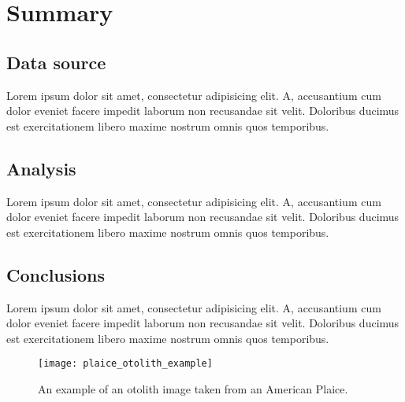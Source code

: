 \section{Summary}

\subsection{Data source}

Lorem ipsum dolor sit amet, consectetur adipisicing elit. A, accusantium cum dolor eveniet facere impedit laborum non recusandae sit velit.
Doloribus ducimus est exercitationem libero maxime nostrum omnis quos temporibus.

\subsection{Analysis}

Lorem ipsum dolor sit amet, consectetur adipisicing elit. A, accusantium cum dolor eveniet facere impedit laborum non recusandae sit velit. Doloribus ducimus est exercitationem libero maxime nostrum omnis quos temporibus.

\subsection{Conclusions}

Lorem ipsum dolor sit amet, consectetur adipisicing elit. A, accusantium cum dolor eveniet facere impedit laborum non recusandae sit velit. Doloribus ducimus est exercitationem libero maxime nostrum omnis quos temporibus.


\begin{figure}
    \texttt{[image: plaice\_otolith\_example]}
    \caption{An example of an otolith image taken from an American Plaice.}
    \label{fig:plaice_oto_example}
\end{figure}